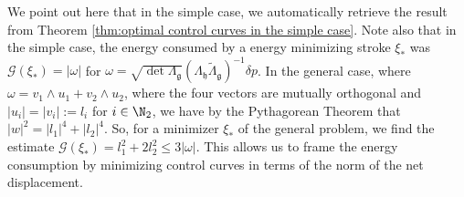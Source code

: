 \begin{remark}
We point out here that in the simple case, we automatically retrieve the result from Theorem \ref{thm:optimal control curves in the simple case}.
Note also that in the simple case, the energy consumed by a energy minimizing stroke $\xi_*$ was $\mathcal{G}(\xi_*) = |\omega|$ for $\omega = \sqrt{\det \Lambda_{\mathfrak{g}}}(\Lambda_{\mathfrak{h}} \tilde{\Lambda}_{\mathfrak{g}})^{-1} \delta p$. In the general case, where $\omega = v_1 \wedge u_1 + v_2 \wedge u_2$, where the four vectors are mutually orthogonal and $|u_i| = |v_i| := l_i$ for $i \in \N_2$, we have by the Pythagorean Theorem that $|w|^2 = |l_1|^4 + |l_2|^4$. So, for a minimizer $\xi_*$ of the general problem, we find the estimate $\mathcal{G}(\xi_*) = l_1^2 + 2 l_2^2 \leq 3 |\omega|$. This allows us to frame the energy consumption by minimizing control curves in terms of the norm of the net displacement.
\end{remark}

